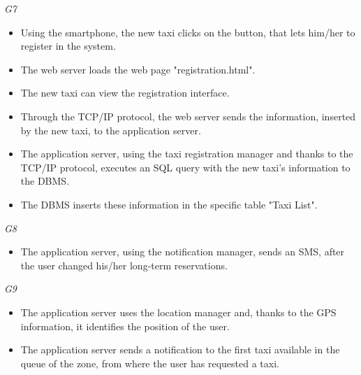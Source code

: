 	\emph{G7}
		\begin{itemize}
			\item Using the smartphone, the new taxi clicks on the button, that lets him/her to register in the system.
			\item The web server loads the web page "registration.html".
			\item The new taxi can view the registration interface.
			\item Through the TCP/IP protocol, the web server sends the information, inserted by the new taxi, to the application server.
			\item The application server, using the taxi registration manager and thanks to the TCP/IP protocol, executes an SQL query with the new taxi's information to the DBMS.
			\item The DBMS inserts these information in the specific table "Taxi List".
		\end{itemize}
	\emph{G8}
		\begin{itemize}
			\item The application server, using the notification manager, sends an SMS, after the user changed his/her long-term reservations.
		\end{itemize}
	\emph{G9}
		\begin{itemize}
			\item The application server uses the location manager and, thanks to the GPS information, it identifies the position of the user.
			\item The application server sends a notification to the first taxi available in the queue of the zone, from where the user has requested a taxi.
		\end{itemize}
		
		
		
		
		
		
		
		
		
		
		
		
		
		
		
		
		
		
		
		
		
		
		
		
		
		
		
		
		
		
		
		
		